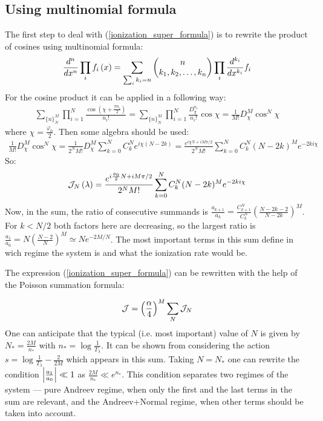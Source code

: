\subsection{Using multinomial formula}
The first step to deal with (\ref{ionization_super_formula}) is to rewrite the product of cosines using multinomial formula:
\begin{gather}
	\frac{d^n}{dx^n}
	\prod_i f_i\left(x\right)
	=
	\sum_{\sum_i k_i=n}
	\begin{pmatrix}
	n
	\\
	k_1,k_2,\dots,k_n
	\end{pmatrix}
	\prod_i
	\frac{d^{k_i}}{dx^{k_i}}
	f_i
\end{gather}
For the cosine product it can be applied in a following way:
\begin{gather}
	\sum_{\{n\}_{N}^{M}}\prod_{i=1}^{N}\frac{\cos(\chi+\frac{\pi n_{i}}{2})}{n_{i}!}=\sum_{\{n\}_{N}^{M}}\prod_{i=1}^{N}\frac{D_{\chi}^{n_{i}}}{n_{i}!}\cos\chi=\frac{1}{M!}D_{\chi}^{M}\cos^{N}\chi
\end{gather}
where $ \chi=\frac{\varphi_0 }{2}$. Then some algebra should be used:
\begin{multline}
\label{after_multinomial}
	\frac{1}{M!}D_{\chi}^{M}\cos^{N}\chi=
	\frac{1}{2^{N}M!}D_{\chi}^{M}\sum_{k=0}^{N}C_{k}^{N}e^{i\chi(N-2k)}
	=
	\frac{e^{i\chi N+iM\pi/2}}{2^{N}M!}\sum_{k=0}^{N}C_{k}^{N}(N-2k)^{M}e^{-2ki\chi}
\end{multline}
So:
\begin{gather}
	\mathcal{J}_N\left(\lambda\right)
	=
		\frac{e^{i\frac{\phi_0}{2} N+iM\pi/2}}{2^{N}M!}\sum_{k=0}^{N}C_{k}^{N}(N-2k)^{M}e^{-2ki\chi}
\end{gather}
Now, in the sum, the ratio of consecutive summands is $ \frac{a_{k+1}}{a_{k}}=\frac{C_{k+1}^{N}}{C_{k}^{N}}\left(\frac{N-2k-2}{N-2k}\right)^{M} $. For $ k<N/2 $ both factors here are decreasing, so the largest ratio is $ \frac{a_{1}}{a_{0}}=N(\frac{N-2}{N})^{M}\simeq Ne^{-2M/N} $. The most important terms in this sum define in wich regime the system is and what the ionization rate would be. 

The expression (\ref{ionization_super_formula}) can be rewritten with the help of the Poisson summation formula:

\begin{gather}
	\mathcal{J}
	=
	\left(\frac{\alpha}{4}\right)^M
	\sum_N
	\mathcal{J}_{N}	
\end{gather}
One can anticipate that the typical (i.e. most important) value of $ N $ is given by $ N_{*}=\frac{2M}{n_{*}} $ with $ n_{*}=\log\frac{1}{T_{\lambda}} $. It can be shown from considering the action $ s=\log\frac{1}{T_\lambda}-\frac{2}{2M} $ which appears in this sum. Taking $ N=N_{*} $ one can rewrite the condition $ \left|\frac{a_{1}}{a_{0}}\right|\ll1 $ as $ \frac{2M}{n_{*}}\ll e^{n_{*}} $. This condition separates two regimes of the system --- pure Andreev regime, when only the first and the last terms in the sum are relevant, and the Andreev+Normal regime, when other terms should be taken into account.

